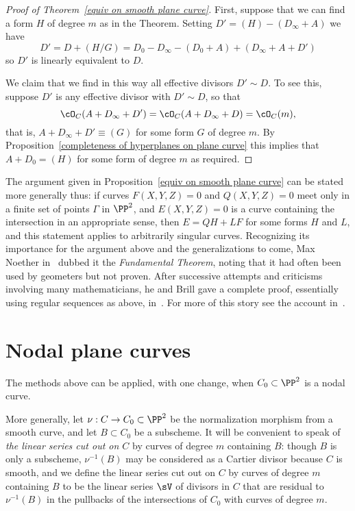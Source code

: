 \begin{proof}[Proof of Theorem~\ref{equiv on smooth plane curve}]
First, suppose that we can find a form $H$ of degree $m$ as in the Theorem.
Setting $D' = (H) -(D_\infty+A)$ we have
$$
D' = D + (H/G) = D_0- D_\infty - (D_0+A)+(D_\infty+A+D')
$$
so $D'$ is linearly equivalent to $D$. 

We claim that we find in this way all effective divisors $D' \sim D$. 
To see this, suppose $D'$ is any effective divisor with $D' \sim D$, so that
$$
\cO_C(A+D_\infty+D') = \cO_C(A+D_\infty+D)  = \cO_C(m),
$$
that is, $A+D_\infty+D' \equiv (G)$ for some form $G$ of degree $m$. By Proposition~\ref{completeness of hyperplanes on plane curve}
this implies that $A+D_{0} = (H)$ for some form of degree $m$ as required.
\end{proof}


The argument given in Proposition~\ref{equiv on smooth plane curve} can be stated more generally thus:  if curves $F(X,Y,Z)=0$ and $Q(X,Y,Z)=0$ 
meet only in a finite set of points $\Gamma$ in $\PP^{2}$, and $E(X,Y,Z) = 0$ is a curve containing the intersection in an appropriate sense,
then $E = QH +LF$ for some forms $H$ and $L$, and this statement applies to arbitrarily singular curves. Recognizing its importance for the argument above and the generalizations to come, Max Noether in~\cite{Noether1873} dubbed it the \emph{Fundamental Theorem}, 
noting that it had often been used by geometers but not proven. After successive attempts and 
criticisms involving many mathematicians, he and Brill gave a complete proof, essentially using
regular sequences as above, in~\cite{Brill-Noether}. For more of this story see the account in~\cite{Eisenbud-Gray}.



\section{Nodal plane curves}\label{nodal curves section}

The methods above can be applied, with one change, when $C_{0}\subset \PP^{2}$
is a nodal curve.

More generally, let $\nu: C\to C_{0}\subset \PP^{2}$ be the normalization morphism from a smooth curve,
and let $B\subset C_{0}$ be a subscheme.
It will be convenient to speak of \emph{the linear series cut out on $C$} by curves of degree $m$
containing $B$: though $B$ is only a subscheme, $\nu^{-1}(B)$ may be considered as a Cartier divisor because
$C$ is smooth, and we define
the linear series cut out on $C$ by curves of degree $m$
containing $B$ to be
the linear series  $\sV$ of divisors in $C$ that are residual to $\nu^{-1}(B)$ in the pullbacks 
of the intersections of $C_{0}$ with curves of degree $m$.

